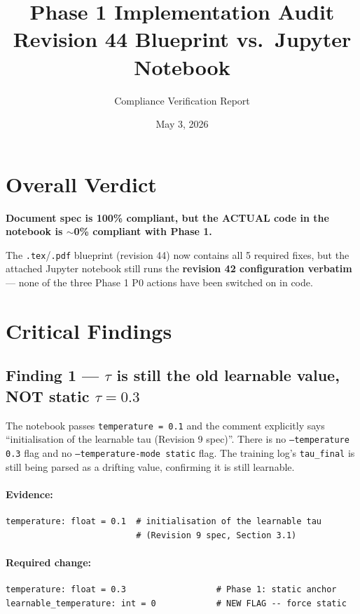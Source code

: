 \documentclass[11pt,a4paper]{article}
\title{\textbf{Phase 1 Implementation Audit\\Revision 44 Blueprint vs.\ Jupyter Notebook}}
\author{Compliance Verification Report}
\date{May 3, 2026}
\newcommand{\xmark}{\ding{55}}
\begin{document}
\maketitle

\section*{Overall Verdict}

\begin{mdframed}[backgroundcolor=backcolour, linecolor=red!60!black, linewidth=1pt]
\textbf{\xmark{} Document spec is 100\% compliant, but the ACTUAL code in the notebook is $\sim$0\% compliant with Phase 1.}

The \texttt{.tex}/\texttt{.pdf} blueprint (revision 44) now contains all 5 required fixes, but the attached Jupyter notebook still runs the \textbf{revision 42 configuration verbatim} --- none of the three Phase 1 P0 actions have been switched on in code.
\end{mdframed}

\section{Critical Findings}

\subsection*{Finding 1 \xmark{} --- $\tau$ is still the old learnable value, NOT static $\tau = 0.3$}

The notebook passes \texttt{temperature = 0.1} and the comment explicitly says ``initialisation of the learnable tau (Revision 9 spec)''. There is no \texttt{--temperature 0.3} flag and no \texttt{--temperature-mode static} flag. The training log's \texttt{tau\_final} is still being parsed as a drifting value, confirming it is still learnable.

\paragraph{Evidence:}
\begin{lstlisting}
temperature: float = 0.1  # initialisation of the learnable tau
                          # (Revision 9 spec, Section 3.1)
\end{lstlisting}

\paragraph{Required change:}
\begin{lstlisting}
temperature: float = 0.3                  # Phase 1: static anchor
learnable_temperature: int = 0            # NEW FLAG -- force static
\end{lstlisting}
\end{document}

